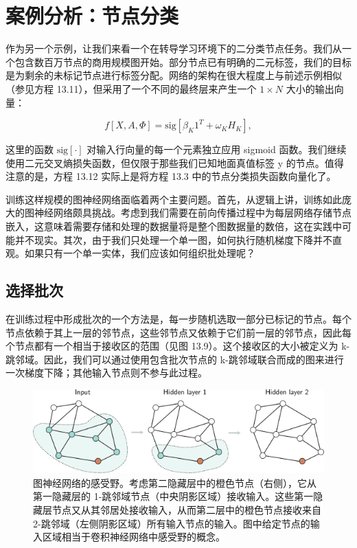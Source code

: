 \section{案例分析：节点分类}
作为另一个示例，让我们来看一个在转导学习环境下的二分类节点任务。我们从一个包含数百万节点的商用规模图开始。部分节点已有明确的二元标签，我们的目标是为剩余的未标记节点进行标签分配。网络的架构在很大程度上与前述示例相似（参见方程 13.11），但采用了一个不同的最终层来产生一个 \(1 \times N\) 大小的输出向量：

\begin{equation}
f[X, A, \Phi] = \text{sig} [\beta_K 1^T + \omega_K H_K ], 
\end{equation}

这里的函数 \(\text{sig}[\cdot]\) 对输入行向量的每一个元素独立应用 sigmoid 函数。我们继续使用二元交叉熵损失函数，但仅限于那些我们已知地面真值标签 y 的节点。值得注意的是，方程 13.12 实际上是将方程 13.3 中的节点分类损失函数向量化了。

训练这样规模的图神经网络面临着两个主要问题。首先，从逻辑上讲，训练如此庞大的图神经网络颇具挑战。考虑到我们需要在前向传播过程中为每层网络存储节点嵌入，这意味着需要存储和处理的数据量将是整个图数据量的数倍，这在实践中可能并不现实。其次，由于我们只处理一个单一图，如何执行随机梯度下降并不直观。如果只有一个单一实体，我们应该如何组织批处理呢？
\subsection{选择批次}
在训练过程中形成批次的一个方法是，每一步随机选取一部分已标记的节点。每个节点依赖于其上一层的邻节点，这些邻节点又依赖于它们前一层的邻节点，因此每个节点都有一个相当于接收区的范围（见图 13.9）。这个接收区的大小被定义为 k-跳邻域。因此，我们可以通过使用包含批次节点的 k-跳邻域联合而成的图来进行一次梯度下降；其他输入节点则不参与此过程。

\begin{figure}[ht!]
\centering
\includegraphics[width=0.7\linewidth]{png/chapter13/GraphReceptiveField.png}
\caption{图神经网络的感受野。考虑第二隐藏层中的橙色节点（右侧），它从第一隐藏层的 1-跳邻域节点（中央阴影区域）接收输入。这些第一隐藏层节点又从其邻居处接收输入，从而第二层中的橙色节点接收来自 2-跳邻域（左侧阴影区域）所有输入节点的输入。图中给定节点的输入区域相当于卷积神经网络中感受野的概念。}
\end{figure}


